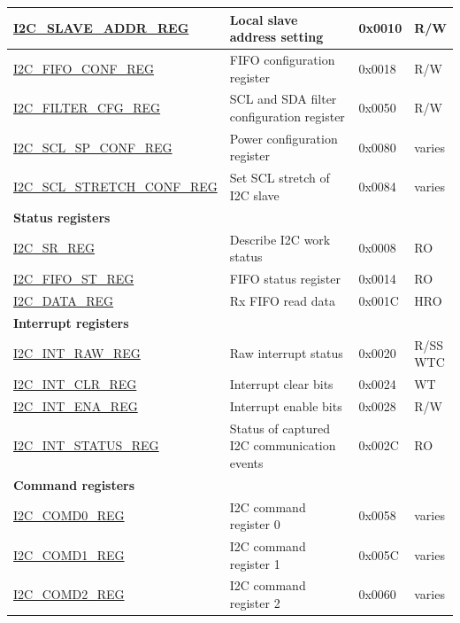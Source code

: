 \begin{longtable}{ | p{6cm} | p{7cm} | p{1.3cm} | p{1cm} | }
    \hyperref[regdesc:I2CSLAVEADDRREG]{I2C\_SLAVE\_ADDR\_REG} & Local slave address setting & 0x0010 & R/W \\ \hline
    \hyperref[regdesc:I2CFIFOCONFREG]{I2C\_FIFO\_CONF\_REG} & FIFO configuration register & 0x0018 & R/W \\ \hline
    \hyperref[regdesc:I2CFILTERCFGREG]{I2C\_FILTER\_CFG\_REG} & SCL and SDA filter configuration register & 0x0050 & R/W \\ \hline
    \hyperref[regdesc:I2CSCLSPCONFREG]{I2C\_SCL\_SP\_CONF\_REG} & Power configuration register & 0x0080 & varies \\ \hline
    \hyperref[regdesc:I2CSCLSTRETCHCONFREG]{I2C\_SCL\_STRETCH\_CONF\_REG} & Set SCL stretch of I2C slave & 0x0084 & varies \\ \hline
    \multicolumn{4}{|l|}{\textbf{Status registers}} \\ \hline
    \hyperref[regdesc:I2CSRREG]{I2C\_SR\_REG} & Describe I2C work status & 0x0008 & RO \\ \hline
    \hyperref[regdesc:I2CFIFOSTREG]{I2C\_FIFO\_ST\_REG} & FIFO status register & 0x0014 & RO \\ \hline
    \hyperref[regdesc:I2CDATAREG]{I2C\_DATA\_REG} & Rx FIFO read data & 0x001C & HRO \\ \hline
    \multicolumn{4}{|l|}{\textbf{Interrupt registers}} \\ \hline
    \hyperref[regdesc:I2CINTRAWREG]{I2C\_INT\_RAW\_REG} & Raw interrupt status & 0x0020 & \makecell{R/SS \\ WTC} \\ \hline
    \hyperref[regdesc:I2CINTCLRREG]{I2C\_INT\_CLR\_REG} & Interrupt clear bits & 0x0024 & WT \\ \hline
    \hyperref[regdesc:I2CINTENAREG]{I2C\_INT\_ENA\_REG} & Interrupt enable bits & 0x0028 & R/W \\ \hline
    \hyperref[regdesc:I2CINTSTATUSREG]{I2C\_INT\_STATUS\_REG} & Status of captured I2C communication events & 0x002C & RO \\ \hline
    \multicolumn{4}{|l|}{\textbf{Command registers}} \\ \hline
    \hyperref[regdesc:I2CCOMD0REG]{I2C\_COMD0\_REG} & I2C command register 0 & 0x0058 & varies \\ \hline
    \hyperref[regdesc:I2CCOMD1REG]{I2C\_COMD1\_REG} & I2C command register 1 & 0x005C & varies \\ \hline
    \hyperref[regdesc:I2CCOMD2REG]{I2C\_COMD2\_REG} & I2C command register 2 & 0x0060 & varies \\ \hline

\end{longtable}
